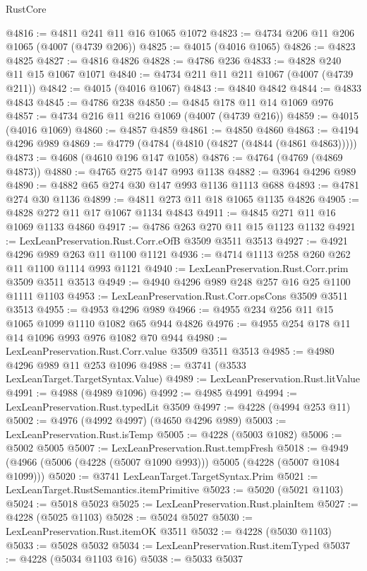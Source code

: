\begin{lexlean}{RustCore}
\begin{coremodule}
@4816 := @4811 @241 @11 @16 @1065 @1072
@4823 := @4734 @206 @11 @206 @1065 (@4007 (@4739 @206))
@4825 := @4015 (@4016 @1065)
@4826 := @4823 @4825
@4827 := @4816 @4826
@4828 := @4786 @236
@4833 := @4828 @240 @11 @15 @1067 @1071
@4840 := @4734 @211 @11 @211 @1067 (@4007 (@4739 @211))
@4842 := @4015 (@4016 @1067)
@4843 := @4840 @4842
@4844 := @4833 @4843
@4845 := @4786 @238
@4850 := @4845 @178 @11 @14 @1069 @976
@4857 := @4734 @216 @11 @216 @1069 (@4007 (@4739 @216))
@4859 := @4015 (@4016 @1069)
@4860 := @4857 @4859
@4861 := @4850 @4860
@4863 := @4194 @4296 @989
@4869 := @4779 (@4784 (@4810 (@4827 (@4844 (@4861 @4863)))))
@4873 := @4608 (@4610 @196 @147 @1058)
@4876 := @4764 (@4769 (@4869 @4873))
@4880 := @4765 @275 @147 @993 @1138
@4882 := @3964 @4296 @989
@4890 := @4882 @65 @274 @30 @147 @993 @1136 @1113 @688
@4893 := @4781 @274 @30 @1136
@4899 := @4811 @273 @11 @18 @1065 @1135 @4826
@4905 := @4828 @272 @11 @17 @1067 @1134 @4843
@4911 := @4845 @271 @11 @16 @1069 @1133 @4860
@4917 := @4786 @263 @270 @11 @15 @1123 @1132
@4921 := LexLeanPreservation.Rust.Corr.eOfB @3509 @3511 @3513
@4927 := @4921 @4296 @989 @263 @11 @1100 @1121
@4936 := @4714 @1113 @258 @260 @262 @11 @1100 @1114 @993 @1121
@4940 := LexLeanPreservation.Rust.Corr.prim @3509 @3511 @3513
@4949 := @4940 @4296 @989 @248 @257 @16 @25 @1100 @1111 @1103
@4953 := LexLeanPreservation.Rust.Corr.opsCons @3509 @3511 @3513
@4955 := @4953 @4296 @989
@4966 := @4955 @234 @256 @11 @15 @1065 @1099 @1110 @1082 @65 @944 @4826
@4976 := @4955 @254 @178 @11 @14 @1096 @993 @976 @1082 @70 @944
@4980 := LexLeanPreservation.Rust.Corr.value @3509 @3511 @3513
@4985 := @4980 @4296 @989 @11 @253 @1096
@4988 := @3741 (@3533 LexLeanTarget.TargetSyntax.Value)
@4989 := LexLeanPreservation.Rust.litValue
@4991 := @4988 (@4989 @1096)
@4992 := @4985 @4991
@4994 := LexLeanPreservation.Rust.typedLit @3509
@4997 := @4228 (@4994 @253 @11)
@5002 := @4976 (@4992 @4997) (@4650 @4296 @989)
@5003 := LexLeanPreservation.Rust.isTemp
@5005 := @4228 (@5003 @1082)
@5006 := @5002 @5005
@5007 := LexLeanPreservation.Rust.tempFresh
@5018 := @4949 (@4966 (@5006 (@4228 (@5007 @1090 @993))) @5005 (@4228 (@5007 @1084 @1099)))
@5020 := @3741 LexLeanTarget.TargetSyntax.Prim
@5021 := LexLeanTarget.RustSemantics.itemPrimitive
@5023 := @5020 (@5021 @1103)
@5024 := @5018 @5023
@5025 := LexLeanPreservation.Rust.plainItem
@5027 := @4228 (@5025 @1103)
@5028 := @5024 @5027
@5030 := LexLeanPreservation.Rust.itemOK @3511
@5032 := @4228 (@5030 @1103)
@5033 := @5028 @5032
@5034 := LexLeanPreservation.Rust.itemTyped
@5037 := @4228 (@5034 @1103 @16)
@5038 := @5033 @5037

\end{coremodule}
\end{lexlean}
